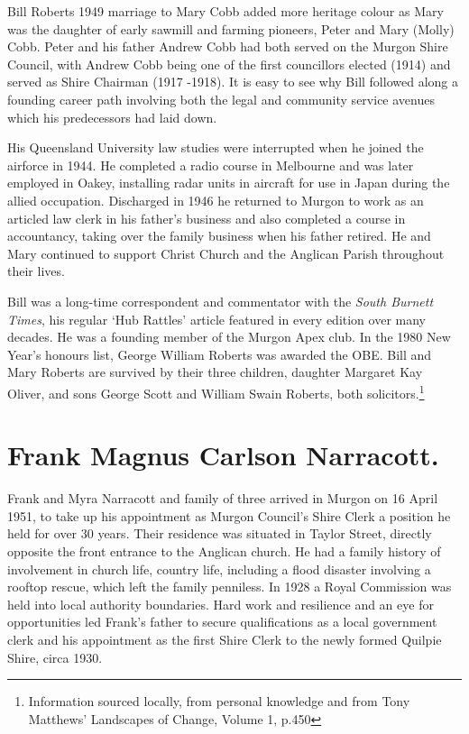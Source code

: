 Bill Roberts 1949 marriage to Mary Cobb added more heritage colour as Mary was the daughter of early sawmill and farming pioneers, Peter and Mary (Molly) Cobb. Peter and his father Andrew Cobb had both served on the Murgon Shire Council, with Andrew Cobb being one of the first councillors elected (1914) and served as Shire Chairman (1917 -1918). It is easy to see why Bill followed along a founding career path involving both the legal and community service avenues which his predecessors had laid down.



His Queensland University law studies were interrupted when he joined the airforce in 1944. He completed a radio course in Melbourne and was later employed in Oakey, installing radar units in aircraft for use in Japan during the allied occupation. Discharged in 1946 he returned to Murgon to work as an articled law clerk in his father's business and also completed a course in accountancy, taking over the family business when his father retired. He and Mary continued to support Christ Church and the Anglican Parish throughout their lives.



Bill was a long-time correspondent and commentator with the \emph{South Burnett Times}, his regular `Hub Rattles' article featured in every edition over many decades. He was a founding member of the Murgon Apex club. In the 1980 New Year's honours list, George William Roberts was awarded the OBE. Bill and Mary Roberts are survived by their three children, daughter Margaret Kay Oliver, and sons George Scott and William Swain Roberts, both solicitors.\footnote{Information sourced locally, from personal knowledge and from Tony Matthews' Landscapes of Change, Volume 1, p.450}


\section{Frank Magnus Carlson Narracott.}



Frank and Myra Narracott and family of three arrived in Murgon on 16 April 1951, to take up his appointment as Murgon Council's Shire Clerk a position he held for over 30 years. Their residence was situated in Taylor Street, directly opposite the front entrance to the Anglican church. He had a family history of involvement in church life, country life, including a flood disaster involving a rooftop rescue, which left the family penniless. In 1928 a Royal Commission was held into local authority boundaries. Hard work and resilience and an eye for opportunities led Frank's father to secure qualifications as a local government clerk and his appointment as the first Shire Clerk to the newly formed Quilpie Shire, circa 1930.



